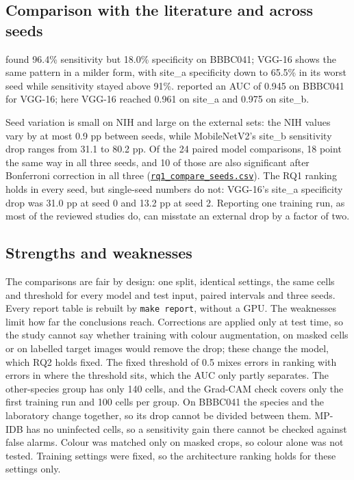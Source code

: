 \documentclass[11pt,a4paper]{article}
\begin{document}
\subsection{Comparison with the literature and across seeds}

\citet{hou2026} found 96.4\% sensitivity but 18.0\% specificity on BBBC041; VGG-16 shows the same pattern in a milder form, with site\_a specificity down to 65.5\% in its worst seed while sensitivity stayed above 91\%. \citet{zhao2020} reported an AUC of 0.945 on BBBC041 for VGG-16; here VGG-16 reached 0.961 on site\_a and 0.975 on site\_b.

Seed variation is small on NIH and large on the external sets: the NIH values vary by at most 0.9 pp between seeds, while \mbox{MobileNetV2}'s site\_b sensitivity drop ranges from 31.1 to 80.2 pp. Of the 24 paired model comparisons, 18 point the same way in all three seeds, and 10 of those are also significant after Bonferroni correction in all three (\href{https://gitlab.uvt.nl/capstone/2026-fall/u927271/-/blob/main/outputs/tables/rq1_compare_seeds.csv}{\texttt{rq1\_\allowbreak{}compare\_\allowbreak{}seeds.\allowbreak{}csv}}). The RQ1 ranking holds in every seed, but single-seed numbers do not: VGG-16's site\_a specificity drop was 31.0 pp at seed 0 and 13.2 pp at seed 2. Reporting one training run, as most of the reviewed studies do, can misstate an external drop by a factor of two.

\subsection{Strengths and weaknesses}

The comparisons are fair by design: one split, identical settings, the same cells and threshold for every model and test input, paired intervals and three seeds. Every report table is rebuilt by \texttt{make report}, without a GPU. The weaknesses limit how far the conclusions reach. Corrections are applied only at test time, so the study cannot say whether training with colour augmentation, on masked cells or on labelled target images would remove the drop; these change the model, which RQ2 holds fixed. The fixed threshold of 0.5 mixes errors in ranking with errors in where the threshold sits, which the AUC only partly separates. The other-species group has only 140 cells, and the Grad-CAM check covers only the first training run and 100 cells per group. On BBBC041 the species and the laboratory change together, so its drop cannot be divided between them. MP-IDB has no uninfected cells, so a sensitivity gain there cannot be checked against false alarms. Colour was matched only on masked crops, so colour alone was not tested. Training settings were fixed, so the architecture ranking holds for these settings only.
\end{document}
